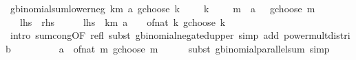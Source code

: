 \begin{isabellebody}
\ gbinomial{\isacharunderscore}{\kern0pt}sum{\isacharunderscore}{\kern0pt}lower{\isacharunderscore}{\kern0pt}neg{\isacharcolon}{\kern0pt}\ {\isachardoublequoteopen}{\isacharparenleft}{\kern0pt}{\isasymSum}k{\isasymle}m{\isachardot}{\kern0pt}\ {\isacharparenleft}{\kern0pt}a\ gchoose\ k{\isacharparenright}{\kern0pt}\ {\isacharasterisk}{\kern0pt}\ {\isacharparenleft}{\kern0pt}{\isacharminus}{\kern0pt}\ {}{\isacharparenright}{\kern0pt}\ {\isacharcircum}{\kern0pt}\ k{\isacharparenright}{\kern0pt}\ {\isacharequal}{\kern0pt}\ {\isacharparenleft}{\kern0pt}{\isacharminus}{\kern0pt}\ {}{\isacharparenright}{\kern0pt}\ {\isacharcircum}{\kern0pt}\ m\ {\isacharasterisk}{\kern0pt}\ {\isacharparenleft}{\kern0pt}a\ {\isacharminus}{\kern0pt}\ {}\ gchoose\ m{\isacharparenright}{\kern0pt}{\isachardoublequoteclose}\isanewline
\ \ {\isacharparenleft}{\kern0pt}\ {\isachardoublequoteopen}{\isacharquery}{\kern0pt}lhs\ {\isacharequal}{\kern0pt}\ {\isacharquery}{\kern0pt}rhs{\isachardoublequoteclose}{\isacharparenright}{\kern0pt}\isanewline
%
\isadelimproof
%
\endisadelimproof
%
\isatagproof
{}\isamarkupfalse%
\ {\isacharminus}{\kern0pt}\isanewline
\ \ \isamarkupfalse%
\ {\isachardoublequoteopen}{\isacharquery}{\kern0pt}lhs\ {\isacharequal}{\kern0pt}\ {\isacharparenleft}{\kern0pt}{\isasymSum}k{\isasymle}m{\isachardot}{\kern0pt}\ {\isacharminus}{\kern0pt}{\isacharparenleft}{\kern0pt}a\ {\isacharplus}{\kern0pt}\ {}{\isacharparenright}{\kern0pt}\ {\isacharplus}{\kern0pt}\ of{\isacharunderscore}{\kern0pt}nat\ k\ gchoose\ k{\isacharparenright}{\kern0pt}{\isachardoublequoteclose}\isanewline
\ \ \ \ \isamarkupfalse%
\ {\isacharparenleft}{\kern0pt}intro\ sum{\isachardot}{\kern0pt}cong{\isacharbrackleft}{\kern0pt}OF\ refl{\isacharbrackright}{\kern0pt}{\isacharparenright}{\kern0pt}\ {\isacharparenleft}{\kern0pt}subst\ gbinomial{\isacharunderscore}{\kern0pt}negated{\isacharunderscore}{\kern0pt}upper{\isacharcomma}{\kern0pt}\ simp\ add{\isacharcolon}{\kern0pt}\ power{\isacharunderscore}{\kern0pt}mult{\isacharunderscore}{\kern0pt}distrib{\isacharparenright}{\kern0pt}\isanewline
\ \ \isamarkupfalse%
\ \isamarkupfalse%
\ {\isachardoublequoteopen}{\isasymdots}\ \ {\isacharequal}{\kern0pt}\ {\isacharminus}{\kern0pt}\ a\ {\isacharplus}{\kern0pt}\ of{\isacharunderscore}{\kern0pt}nat\ m\ gchoose\ m{\isachardoublequoteclose}\isanewline
\ \ \ \ \isamarkupfalse%
\ {\isacharparenleft}{\kern0pt}subst\ gbinomial{\isacharunderscore}{\kern0pt}parallel{\isacharunderscore}{\kern0pt}sum{\isacharparenright}{\kern0pt}\ simp\isanewline

\end{isabellebody}
